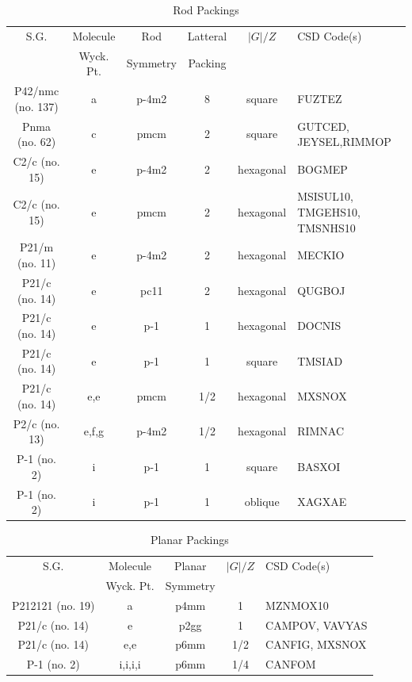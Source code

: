 \documentclass[preprint]{iucr}              %
\begin{document}
\begin{table}
\caption{Rod Packings}
\label{tab_rods}
\begin{tabular}{cccccl}     %
S.G. 	& Molecule 	& Rod 		& Latteral & $|G|/Z$& CSD Code(s) \\
	& Wyck. Pt. 	& Symmetry 	& Packing \\
\hline
P42/nmc (no. 137) & a & p-4m2 & 8	& square & FUZTEZ \\
Pnma (no. 62) & c & pmcm	& 2	& square & GUTCED, JEYSEL,RIMMOP \\
C2/c (no. 15) & e & p-4m2	& 2	& hexagonal & BOGMEP \\
C2/c (no. 15)	& e & pmcm	& 2	& hexagonal & MSISUL10, TMGEHS10, TMSNHS10 \\
P21/m (no. 11) & e & p-4m2	& 2	& hexagonal & MECKIO \\
P21/c (no. 14) & e & pc11	& 2	& hexagonal & QUGBOJ \\
P21/c (no. 14) & e & p-1	& 1	& hexagonal & DOCNIS \\
P21/c (no. 14) & e & p-1	& 1	& square & TMSIAD \\
P21/c (no. 14) & e,e & pmcm	& 1/2	& hexagonal & MXSNOX \\
P2/c (no. 13) & e,f,g & p-4m2	& 1/2 	& hexagonal & RIMNAC \\
P-1 (no. 2) & i 	& p-1		& 1	& square & BASXOI \\
P-1 (no. 2) & i 	& p-1		& 1	& oblique & XAGXAE \\
\hline
\end{tabular}
\end{table}

\begin{table}
\caption{Planar Packings}
\label{tab_planes}
\begin{tabular}{ccccl}      %
S.G. & Molecule & Planar & $|G|/Z$& CSD Code(s) \\
	& Wyck. Pt. & Symmetry \\
\hline
P212121 (no. 19) & a &  p4mm	& 1	& MZNMOX10 \\
P21/c (no. 14) & e & p2gg	& 1	& CAMPOV, VAVYAS \\
P21/c (no. 14) & e,e & p6mm	& 1/2	& CANFIG, MXSNOX \\
P-1 (no. 2) & i,i,i,i & p6mm	& 1/4	& CANFOM \\
\hline
\end{tabular}
\end{table}
\end{document}
